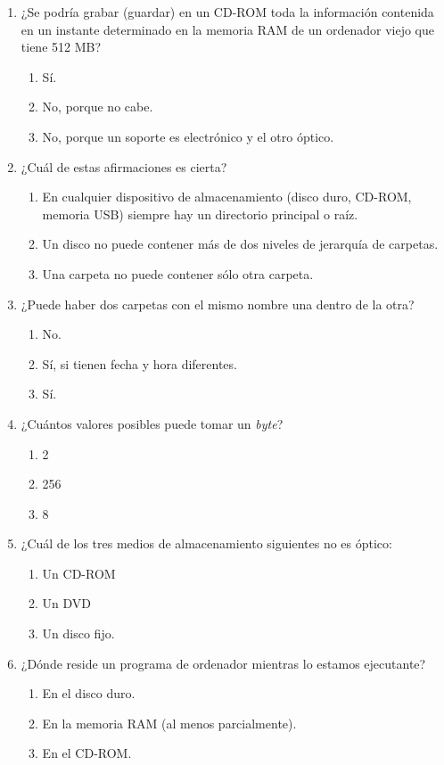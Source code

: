 \begin{enumerate}
\item ¿Se podría grabar (guardar) en un CD-ROM toda la información contenida en un instante determinado en la memoria RAM de un ordenador viejo que tiene 512 MB? \begin{enumerate} \item Sí. \item No, porque no cabe. \item No, porque un soporte es electrónico y el otro óptico. \end{enumerate} 

\item ¿Cuál de estas afirmaciones es cierta? \begin{enumerate} \item En cualquier dispositivo de almacenamiento (disco duro, CD-ROM, memoria USB) siempre hay un directorio principal o raíz. \item Un disco no puede contener más de dos niveles de jerarquía de carpetas. \item Una carpeta no puede contener sólo otra carpeta. \end{enumerate} 

\item ¿Puede haber dos carpetas con el mismo nombre una dentro de la otra? \begin{enumerate} \item No. \item Sí, si tienen fecha y hora diferentes. \item Sí. \end{enumerate} 

\item ¿Cuántos valores posibles puede tomar un \emph{byte}? \begin{enumerate} \item 2 \item 256 \item 8 \end{enumerate} 

\item ¿Cuál de los tres medios de almacenamiento siguientes no es óptico: \begin{enumerate} \item Un CD-ROM \item Un DVD \item Un disco fijo. \end{enumerate} 

\item ¿Dónde reside un programa de ordenador mientras lo estamos ejecutante? \begin{enumerate} \item En el disco duro. \item En la memoria RAM (al menos parcialmente). \item En el CD-ROM. \end{enumerate} 


\end{enumerate}
